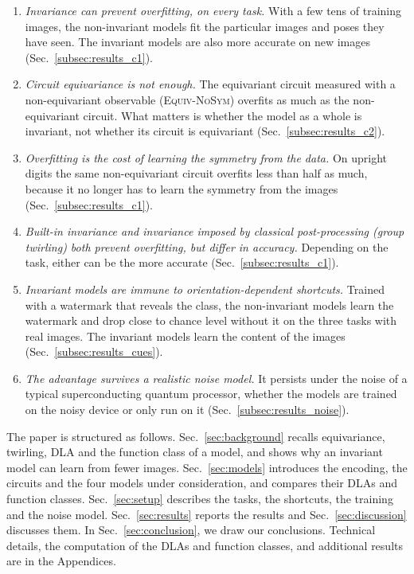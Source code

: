 \documentclass[aps,pra,reprint,superscriptaddress,longbibliography]{revtex4-2}
\newcommand{\NoSym}{\textsc{Equiv-NoSym}}
\begin{document}
\begin{enumerate}
\item \emph{Invariance can prevent overfitting, on every task.} With a few tens of training images, the non-invariant models fit the particular images and poses they have seen. The invariant models are also more accurate on new images (Sec.~\ref{subsec:results_c1}).
\item \emph{Circuit equivariance is not enough.} The equivariant circuit measured with a non-equivariant observable (\NoSym) overfits as much as the non-equivariant circuit. What matters is whether the model as a whole is invariant, not whether its circuit is equivariant (Sec.~\ref{subsec:results_c2}).
\item \emph{Overfitting is the cost of learning the symmetry from the data.} On upright digits the same non-equivariant circuit overfits less than half as much, because it no longer has to learn the symmetry from the images (Sec.~\ref{subsec:results_c1}).
\item \emph{Built-in invariance and invariance imposed by classical post-processing (group twirling) both prevent overfitting, but differ in accuracy.} Depending on the task, either can be the more accurate (Sec.~\ref{subsec:results_c1}).
\item \emph{Invariant models are immune to orientation-dependent shortcuts.} Trained with a watermark that reveals the class, the non-invariant models learn the watermark and drop close to chance level without it on the three tasks with real images. The invariant models learn the content of the images (Sec.~\ref{subsec:results_cues}).
\item \emph{The advantage survives a realistic noise model.} It persists under the noise of a typical superconducting quantum processor, whether the models are trained on the noisy device or only run on it (Sec.~\ref{subsec:results_noise}).

\end{enumerate}

The paper is structured as follows. Sec.~\ref{sec:background} recalls equivariance, twirling, DLA and the function class of a model, and shows why an invariant model can learn from fewer images. Sec.~\ref{sec:models} introduces the encoding, the circuits and the four models under consideration, and compares their DLAs and function classes. Sec.~\ref{sec:setup} describes the tasks, the shortcuts, the training and the noise model. Sec.~\ref{sec:results} reports the results and Sec.~\ref{sec:discussion} discusses them. In Sec.~\ref{sec:conclusion}, we draw our conclusions. Technical details, the computation of the DLAs and function classes, and additional results are in the Appendices.
\end{document}
